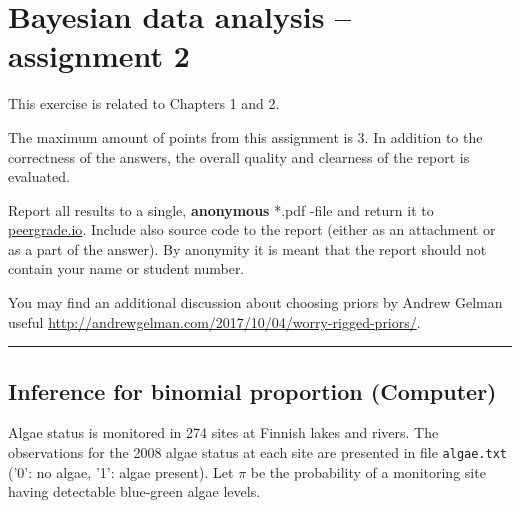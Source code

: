 \documentclass[a4paper,11pt]{article}
\newcommand{\HRule}{\rule{\linewidth}{0.5mm}}
\begin{document}
\thispagestyle{empty}

\section*{Bayesian data analysis -- assignment 2}

This exercise is related to Chapters 1 and 2.

The maximum amount of points from this assignment is 3. In addition to the correctness of the answers, the overall quality and clearness of the report is evaluated.

Report all results to a single, {\bf anonymous} *.pdf -file and return it to \href{peergrade.io}{peergrade.io}. Include also source code to the report (either as an attachment or as a part of the answer). By anonymity it is meant that the report should not contain your name or student number.

You may find an additional discussion about choosing priors by Andrew Gelman useful
\url{http://andrewgelman.com/2017/10/04/worry-rigged-priors/}.

\HRule

\vspace{1cm}

\subsection*{Inference for binomial proportion (Computer)}

Algae status is monitored in 274 sites at Finnish lakes and rivers.
The observations for the 2008 algae status at each site are presented
in file {\tt algae.txt} ('0': no algae, '1': algae present).
Let $\pi$ be the probability of a monitoring site having detectable
blue-green algae levels.
\end{document}
